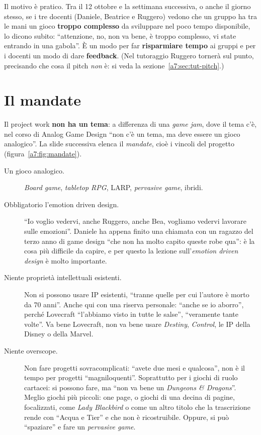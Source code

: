 Il motivo è pratico. Tra il 12 ottobre e la settimana successiva, o anche il giorno
stesso, se i tre docenti (Daniele, Beatrice e Ruggero) vedono che un gruppo ha tra
le mani un gioco \textbf{troppo complesso} da sviluppare nel poco tempo disponibile,
lo dicono subito: ``attenzione, no, non va bene, è troppo complesso, vi state
entrando in una gabola''. È un modo per far \textbf{risparmiare tempo} ai gruppi e
per i docenti un modo di dare \textbf{feedback}. (Nel tutoraggio Ruggero tornerà
sul punto, precisando che cosa il pitch \emph{non} è: si veda la
sezione~\ref{a7:sec:tut-pitch}.)

\section{Il mandate}
\label{a7:sec:mandate}

Il project work \textbf{non ha un tema}: a differenza di una \emph{game jam}, dove
il tema c'è, nel corso di Analog Game Design ``non c'è un tema, ma deve essere un
gioco analogico''. La slide successiva elenca il \emph{mandate}, cioè i vincoli del
progetto (figura~\ref{a7:fig:mandate}).

\begin{description}
  \item[Un gioco analogico.] \emph{Board game}, \emph{tabletop RPG}, LARP,
        \emph{pervasive game}, ibridi.
  \item[Obbligatorio l'emotion driven design.] ``Io voglio vedervi, anche
        Ruggero, anche Bea, vogliamo vedervi lavorare sulle emozioni''. Daniele ha
        appena finito una chiamata con un ragazzo del terzo anno di game design
        ``che non ha molto capito queste robe qua'': è la cosa più difficile da
        capire, e per questo la lezione sull'\emph{emotion driven design} è molto
        importante.
  \item[Niente proprietà intellettuali esistenti.] Non si possono usare IP
        esistenti, ``tranne quelle per cui l'autore è morto da 70 anni''. Anche
        qui con una riserva personale: ``anche se io aborro'', perché Lovecraft
        ``l'abbiamo visto in tutte le salse'', ``veramente tante volte''. Va bene
        Lovecraft, non va bene usare \emph{Destiny}, \emph{Control}, le IP della
        Disney o della Marvel.
  \item[Niente overscope.] Non fare progetti sovracomplicati: ``avete due mesi e
        qualcosa'', non è il tempo per progetti ``magniloquenti''. Soprattutto per i
        giochi di ruolo cartacei: si possono fare, ma ``non va bene un
        \emph{Dungeons \& Dragons}''. Meglio giochi più piccoli: one page, o giochi
        di una decina di pagine, focalizzati, come \emph{Lady Blackbird} o come un
        altro titolo che la trascrizione rende con ``Acqua e Tier'' e che non è
        ricostruibile. Oppure, si può ``spaziare'' e fare un \emph{pervasive game}.
\end{description}

